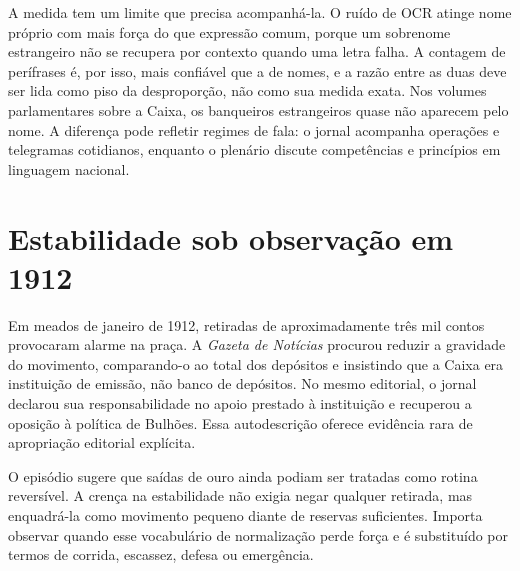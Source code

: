 A medida tem um limite que precisa acompanhá-la. O ruído de OCR atinge nome próprio com mais força do que expressão comum, porque um sobrenome estrangeiro não se recupera por contexto quando uma letra falha. A contagem de perífrases é, por isso, mais confiável que a de nomes, e a razão entre as duas deve ser lida como piso da desproporção, não como sua medida exata. Nos volumes parlamentares sobre a Caixa, os banqueiros estrangeiros quase não aparecem pelo nome. A diferença pode refletir regimes de fala: o jornal acompanha operações e telegramas cotidianos, enquanto o plenário discute competências e princípios em linguagem nacional.


\section{Estabilidade sob observação em 1912}

Em meados de janeiro de 1912, retiradas de aproximadamente três mil contos provocaram alarme na praça. A \textit{Gazeta de Notícias} procurou reduzir a gravidade do movimento, comparando-o ao total dos depósitos e insistindo que a Caixa era instituição de emissão, não banco de depósitos. No mesmo editorial, o jornal declarou sua responsabilidade no apoio prestado à instituição e recuperou a oposição à política de Bulhões. Essa autodescrição oferece evidência rara de apropriação editorial explícita.


O episódio sugere que saídas de ouro ainda podiam ser tratadas como rotina reversível. A crença na estabilidade não exigia negar qualquer retirada, mas enquadrá-la como movimento pequeno diante de reservas suficientes. Importa observar quando esse vocabulário de normalização perde força e é substituído por termos de corrida, escassez, defesa ou emergência.

